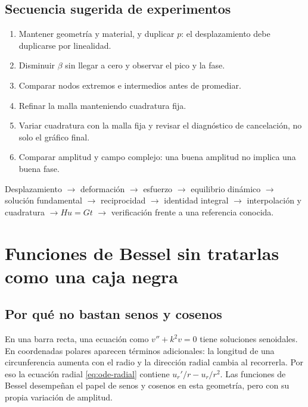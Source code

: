 \documentclass[11pt,a4paper]{report}
\numberwithin{equation}{chapter}
\begin{document}
\section{Secuencia sugerida de experimentos}
\begin{enumerate}
 \item Mantener geometr\'ia y material, y duplicar $p$: el desplazamiento
 debe duplicarse por linealidad.
 \item Disminuir $\beta$ sin llegar a cero y observar el pico y la fase.
 \item Comparar nodos extremos e intermedios antes de promediar.
 \item Refinar la malla manteniendo cuadratura fija.
 \item Variar cuadratura con la malla fija y revisar el diagn\'ostico
 de cancelaci\'on, no solo el gr\'afico final.
 \item Comparar amplitud y campo complejo: una buena amplitud no implica
 una buena fase.
\end{enumerate}

\begin{idea}
Desplazamiento $\longrightarrow$ deformaci\'on $\longrightarrow$
esfuerzo $\longrightarrow$ equilibrio din\'amico
$\longrightarrow$ soluci\'on fundamental
$\longrightarrow$ reciprocidad
$\longrightarrow$ identidad integral
$\longrightarrow$ interpolaci\'on y cuadratura
$\longrightarrow H u=G t$
$\longrightarrow$ verificaci\'on frente a una referencia conocida.
\end{idea}

\appendix
\chapter{Funciones de Bessel sin tratarlas como una caja negra}
\label{app:bessel}

\section{Por qu\'e no bastan senos y cosenos}
En una barra recta, una ecuaci\'on como $v''+k^2v=0$ tiene soluciones
senoidales. En coordenadas polares aparecen t\'erminos adicionales:
la longitud de una circunferencia aumenta con el radio y la direcci\'on
radial cambia al recorrerla. Por eso la ecuaci\'on radial
\eqref{eq:ode-radial} contiene $u_r'/r-u_r/r^2$.
Las funciones de Bessel desempe\~nan el papel de senos y cosenos en
esta geometr\'ia, pero con su propia variaci\'on de amplitud.
\end{document}
